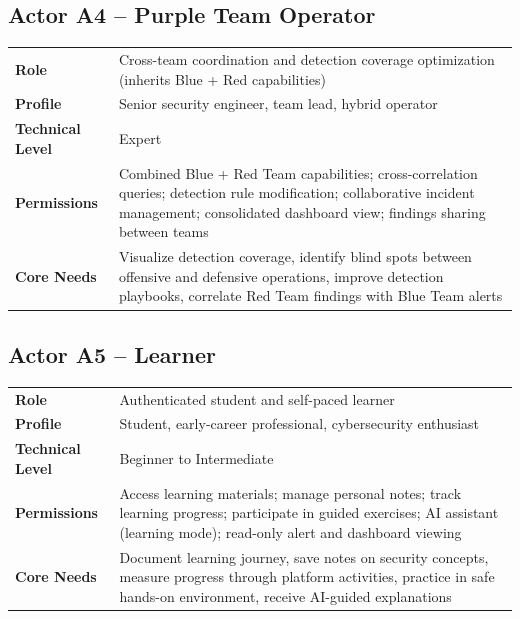 \documentclass[12pt,a4paper]{report}
\begin{document}
	\subsection{Actor A4 -- Purple Team Operator}
	\begin{infobox}[title=Purple Team Operator]
		\begin{tabular}{L{3.8cm} L{8.8cm}}
			\textbf{Role} & Cross-team coordination and detection coverage optimization (inherits Blue + Red capabilities) \\
			\textbf{Profile} & Senior security engineer, team lead, hybrid operator \\
			\textbf{Technical Level} & Expert \\
			\textbf{Permissions} & Combined Blue + Red Team capabilities; cross-correlation queries; detection rule modification; collaborative incident management; consolidated dashboard view; findings sharing between teams \\
			\textbf{Core Needs} & Visualize detection coverage, identify blind spots between offensive and defensive operations, improve detection playbooks, correlate Red Team findings with Blue Team alerts \\
		\end{tabular}
	\end{infobox}
	
	\subsection{Actor A5 -- Learner}
	\begin{infobox}[title=Learner]
		\begin{tabular}{L{3.8cm} L{8.8cm}}
			\textbf{Role} & Authenticated student and self-paced learner \\
			\textbf{Profile} & Student, early-career professional, cybersecurity enthusiast \\
			\textbf{Technical Level} & Beginner to Intermediate \\
			\textbf{Permissions} & Access learning materials; manage personal notes; track learning progress; participate in guided exercises; AI assistant (learning mode); read-only alert and dashboard viewing \\
			\textbf{Core Needs} & Document learning journey, save notes on security concepts, measure progress through platform activities, practice in safe hands-on environment, receive AI-guided explanations \\
		\end{tabular}
	\end{infobox}
	
\end{document}
